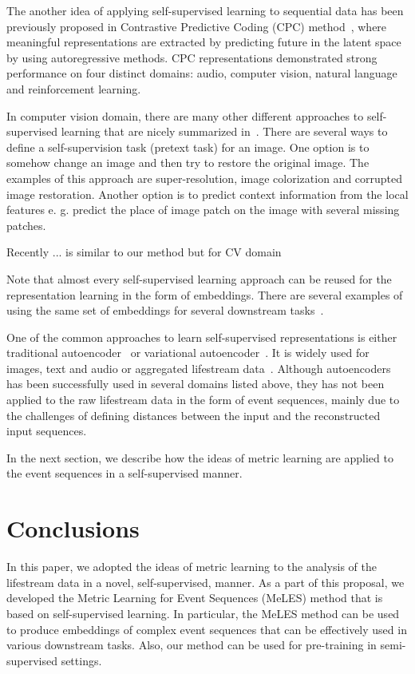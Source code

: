 \documentclass{article}
\begin{document}
The another idea of applying self-supervised learning to sequential data has been previously proposed in Contrastive Predictive Coding (CPC) method~\cite{Oord2018RepresentationLW}, where meaningful representations are extracted by predicting future in the latent space by using autoregressive methods. CPC representations demonstrated strong performance on four distinct domains: audio, computer vision, natural language and reinforcement learning. 

In computer vision domain, there are many other different approaches to self-supervised learning that are nicely summarized in~\cite{Jing2020SelfsupervisedVF}. There are several ways to define a self-supervision task (pretext task) for an image. One option is to somehow change an image and then try to restore the original image. The examples of this approach are super-resolution, image colorization and corrupted image restoration. Another option is to predict context information from the local features e. g. predict the place of image patch on the image with several missing patches.

Recently ... \cite{Chen2020ASF} is similar to our method but for CV domain

Note that almost every self-supervised learning approach can be reused for the representation learning in the form of embeddings. There are several examples of using the same set of embeddings for several downstream tasks~\cite{Song2017LearningUE, Zhai2019LearningAU}.

One of the common approaches to learn self-supervised representations is either traditional autoencoder~\cite{Rumelhart1986LearningIR} or variational autoencoder~\cite{Kingma2014AutoEncodingVB}. It is widely used for images, text and audio or aggregated lifestream data~\cite{Mancisidor2019LearningLR}. Although autoencoders has been successfully used in several domains listed above, they has not been applied to the raw lifestream data in the form of event sequences, mainly due to the challenges of defining distances between the input and the reconstructed input sequences.

In the next section, we describe how the ideas of metric learning are applied to the event sequences in a self-supervised manner.


\section{Conclusions} \label{sec-conclusions}

In this paper, we adopted the ideas of metric learning to the analysis of the lifestream data in a novel, self-supervised, manner. As a part of this proposal, we developed the Metric Learning for Event Sequences (MeLES) method that is based on self-supervised learning. 
In particular, the MeLES method can be used to produce embeddings of complex event sequences that can be effectively used in various downstream tasks. Also, our method can be used for pre-training in semi-supervised settings.
\end{document}
